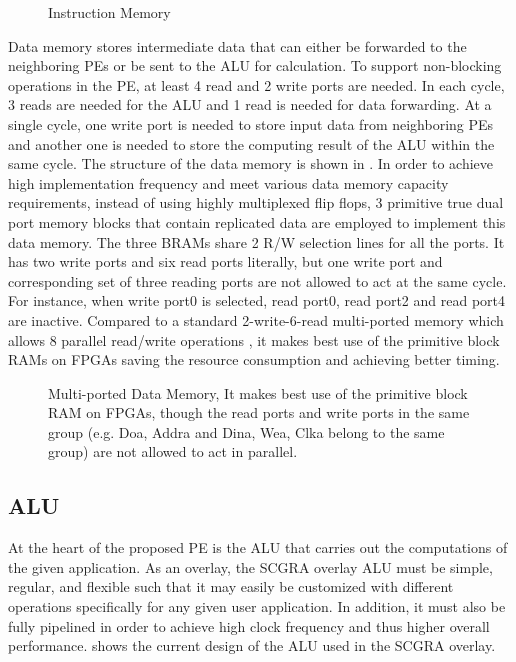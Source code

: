 \begin{figure}
\caption{Instruction Memory}
\label{fig:inst-rom}
\end{figure}

Data memory stores intermediate data that can either be forwarded to the neighboring PEs or be sent to the ALU for calculation. To support non-blocking operations in the PE, at least 4 read and 2 write ports are needed. In each cycle, 3 reads are needed for the ALU and 1 read is needed for data forwarding. At a single cycle, one write port is needed to store input data from neighboring PEs and another one is needed to store the computing result of the ALU within the same cycle. The structure of the data memory is shown in . In order to achieve high implementation frequency and meet various data memory capacity requirements, instead of using highly multiplexed flip flops, 3 primitive true dual port memory blocks that contain replicated data are employed to implement this data memory. The three BRAMs share 2 R/W selection lines for all the ports. It has two write ports and six read ports literally, but one write port and corresponding set of three reading ports are not allowed to act at the same cycle. For instance, when write port0 is selected, read port0, read port2 and read port4 are inactive. Compared to a standard 2-write-6-read multi-ported memory which allows 8 parallel read/write operations \cite{abdelhadi2014modular}, it makes best use of the primitive block RAMs on FPGAs saving the resource consumption and achieving better timing. 

\begin{figure}
\caption{Multi-ported Data Memory, It makes best use of the primitive block RAM on FPGAs, though the read ports and write ports in the same group (e.g. Doa, Addra and Dina, Wea, Clka belong to the same group) are not allowed to act in parallel.}
\label{fig:data-mem}
\end{figure}

\subsection{ALU}
At the heart of the proposed PE is the ALU that carries out the computations of the given application.  As an overlay, the SCGRA overlay ALU must be simple, regular, and flexible such that it may easily be customized with different operations specifically for any given user application.  In addition, it must also be fully pipelined in order to achieve high clock frequency and thus higher overall performance.  shows the current design of the ALU used in the SCGRA overlay.

